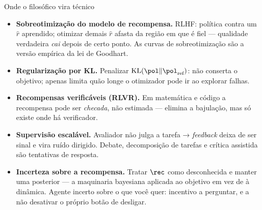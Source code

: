 \documentclass[aspectratio=169, 11pt]{beamer}
\begin{document}
\begin{frame}{Onde o filosófico vira técnico}
  {\footnotesize
  \begin{itemize}\setlength{\itemsep}{0.5ex}
    \item \textbf{Sobreotimização do modelo de recompensa.} RLHF: política
          contra um $\hat{r}$ aprendido; otimizar demais $\hat{r}$ afasta da
          região em que é fiel --- qualidade verdadeira \emph{cai} depois de
          certo ponto. As curvas de sobreotimização são a versão empírica da
          lei de Goodhart.
    \item \textbf{Regularização por KL.} Penalizar
          $\mathrm{KL}(\pol\|\pol_{\text{ref}})$: não conserta o objetivo;
          apenas limita quão longe o otimizador pode ir ao explorar falhas.
    \item \textbf{Recompensas verificáveis (RLVR).} Em matemática e código a
          recompensa pode ser \emph{checada}, não estimada --- elimina a
          bajulação, mas só existe onde há verificador.
    \item \textbf{Supervisão escalável.} Avaliador não julga a tarefa →
          \emph{feedback} deixa de ser sinal e vira ruído dirigido. Debate,
          decomposição de tarefas e crítica assistida são tentativas de
          resposta.
    \item \textbf{Incerteza sobre a recompensa.} Tratar $\rec$ como
          desconhecida e manter uma posterior --- a maquinaria bayesiana
          aplicada ao objetivo em vez de à dinâmica. Agente incerto sobre o
          que você quer: incentivo a perguntar, e a não desativar o próprio
          botão de desligar.
  \end{itemize}}
\end{frame}
\end{document}
